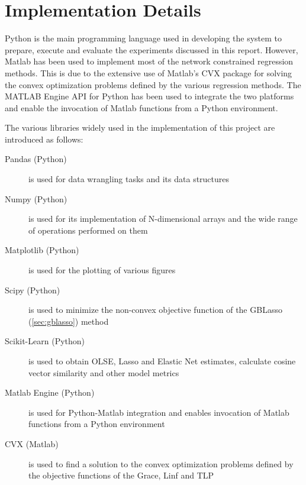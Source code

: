 \chapter{Implementation Details} \label{sec:implementation}
Python is the main programming language used in developing the system to prepare, execute and evaluate the experiments discussed in this report. However, Matlab has been used to implement most of the network constrained regression methods. This is due to the extensive use of Matlab's CVX package \cite{grant2014cvx}\cite{grant2008graph} for solving the convex optimization problems defined by the various regression methods. The MATLAB Engine API for Python has been used to integrate the two platforms and enable the invocation of Matlab functions from a Python environment.

The various libraries widely used in the implementation of this project are introduced as follows:
\begin{description}
	\item[Pandas (Python)] is used for data wrangling tasks and its data structures
	\item[Numpy (Python)] is used for its implementation of N-dimensional arrays and the wide range of operations performed on them
	\item[Matplotlib (Python)] is used for the plotting of various figures
	\item[Scipy (Python)] is used to minimize the non-convex objective function of the GBLasso (\ref{sec:gblasso}) method
	\item[Scikit-Learn (Python)] is used to obtain OLSE, Lasso and Elastic Net estimates, calculate cosine vector similarity and other model metrics 
	\item[Matlab Engine (Python)] is used for Python-Matlab integration and enables invocation of Matlab functions from a Python environment
	\item[CVX (Matlab)] is used to find a solution to the convex optimization problems defined by the objective functions of the Grace, Linf and TLP
\end{description}

